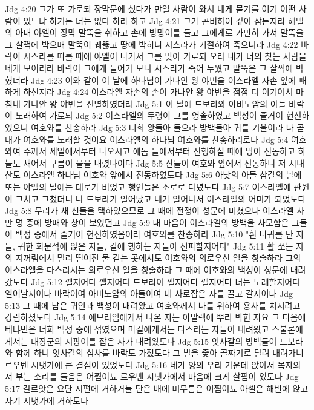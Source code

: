 Jdg 4:20  그가 또 가로되 장막문에 섰다가 만일 사람이 와서 네게 묻기를 여기 어떤 사람이 있느냐 하거든 너는 없다 하라 하고
Jdg 4:21  그가 곤비하여 깊이 잠든지라 헤벨의 아내 야엘이 장막 말뚝을 취하고 손에 방망이를 들고 그에게로 가만히 가서 말뚝을 그 살쩍에 박으매 말뚝이 꿰뚫고 땅에 박히니 시스라가 기절하여 죽으니라
Jdg 4:22  바락이 시스라를 따를 때에 야엘이 나가서 그를 맞아 가로되 오라 내가 너의 찾는 사람을 네게 보이리라 바락이 그에게 들어가 보니 시스라가 죽어 누웠고 말뚝은 그 살쩍에 박혔더라
Jdg 4:23  이와 같이 이 날에 하나님이 가나안 왕 야빈을 이스라엘 자손 앞에 패하게 하신지라
Jdg 4:24  이스라엘 자손의 손이 가나안 왕 야빈을 점점 더 이기어서 마침내 가나안 왕 야빈을 진멸하였더라
Jdg 5:1  이 날에 드보라와 아비노암의 아들 바락이 노래하여 가로되
Jdg 5:2  이스라엘의 두령이 그를 영솔하였고 백성이 즐거이 헌신하였으니 여호와를 찬송하라
Jdg 5:3  너희 왕들아 들으라 방백들아 귀를 기울이라 나 곧 내가 여호와를 노래할 것이요 이스라엘의 하나님 여호와를 찬송하리로다
Jdg 5:4  여호와여 주께서 세일에서부터 나오시고 에돔 들에서부터 진행하실 때에 땅이 진동하고 하늘도 새어서 구름이 물을 내렸나이다
Jdg 5:5  산들이 여호와 앞에서 진동하니 저 시내산도 이스라엘 하나님 여호와 앞에서 진동하였도다
Jdg 5:6  아낫의 아들 삼갈의 날에 또는 야엘의 날에는 대로가 비었고 행인들은 소로로 다녔도다
Jdg 5:7  이스라엘에 관원이 그치고 그쳤더니 나 드보라가 일어났고 내가 일어나서 이스라엘의 어미가 되었도다
Jdg 5:8  무리가 새 신들을 택하였으므로 그 때에 전쟁이 성문에 미쳤으나 이스라엘 사만 명 중에 방패와 창이 보였던고
Jdg 5:9  내 마음이 이스라엘의 방백을 사모함은 그들이 백성 중에서 즐거이 헌신하였음이라 여호와를 찬송하라
Jdg 5:10  "흰 나귀를 탄 자들, 귀한 화문석에 앉은 자들, 길에 행하는 자들아 선파할지어다"
Jdg 5:11  활 쏘는 자의 지꺼림에서 멀리 떨어진 물 긷는 곳에서도 여호와의 의로우신 일을 칭술하라 그의 이스라엘을 다스리시는 의로우신 일을 칭술하라 그 때에 여호와의 백성이 성문에 내려갔도다
Jdg 5:12  깰지어다 깰지어다 드보라여 깰지어다 깰지어다 너는 노래할지어다 일어날지어다 바락이여 아비노암의 아들이여 네 사로잡은 자를 끌고 갈지어다
Jdg 5:13  그 때에 남은 귀인과 백성이 내려왔고 여호와께서 나를 위하여 용사를 치시려고 강림하셨도다
Jdg 5:14  에브라임에게서 나온 자는 아말렉에 뿌리 박힌 자요 그 다음에 베냐민은 너희 백성 중에 섞였으며 마길에게서는 다스리는 자들이 내려왔고 스불론에게서는 대장군의 지팡이를 잡은 자가 내려왔도다
Jdg 5:15  잇사갈의 방백들이 드보라와 함께 하니 잇사갈의 심사를 바락도 가졌도다 그 발을 좇아 골짜기로 달려 내려가니 르우벤 시냇가에 큰 결심이 있었도다
Jdg 5:16  네가 양의 우리 가운데 앉아서 목자의 저 부는 소리를 들음은 어찜이뇨 르우벤 시냇가에서 마음에 크게 살핌이 있도다
Jdg 5:17  길르앗은 요단 저편에 거하거늘 단은 배에 머무름은 어찜이뇨 아셀은 해빈에 앉고 자기 시냇가에 거하도다
